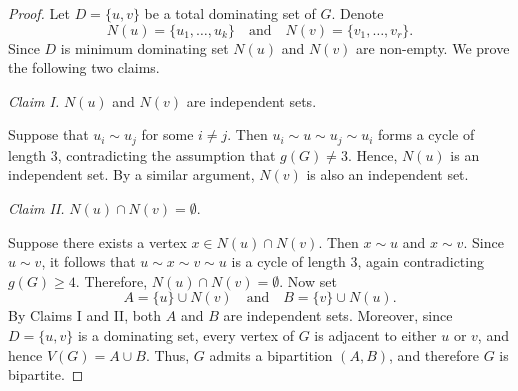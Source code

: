 \documentclass[10pt,a4paper]{amsart}
\begin{document}
\begin{proof}
Let $D=\{u,v\}$ be a total dominating set of $G$. 
Denote
\[
N(u)=\{u_1,\dots,u_k\}
\quad \text{and} \quad
N(v)=\{v_1,\dots,v_r\}.
\]
Since $D$ is minimum dominating set $N(u)$ and $N(v)$ are non-empty.
We prove the following two claims.

\medskip
\noindent
\textit{Claim I.} $N(u)$ and $N(v)$ are independent sets.

Suppose that $u_i\sim u_j$ for some $i\neq j$. Then
$u_i \sim u \sim u_j \sim u_i$ forms a cycle of length $3$, contradicting the assumption that $g(G)\neq 3$. Hence, $N(u)$ is an independent set. By a similar argument, $N(v)$ is also an independent set.

\medskip
\noindent
\textit{Claim II.} $N(u)\cap N(v)=\emptyset$.

Suppose there exists a vertex $x\in N(u)\cap N(v)$. Then $x\sim u$ and $x\sim v$. Since $u\sim v$, it follows that
$u \sim x \sim v \sim u$
is a cycle of length $3$, again contradicting $g(G)\ge 4$. Therefore, $N(u)\cap N(v)=\emptyset$. Now set
\[
A=\{u\}\cup N(v)
\quad \text{and} \quad
B=\{v\}\cup N(u).
\]
By Claims I and II, both $A$ and $B$ are independent sets. Moreover, since $D=\{u,v\}$ is a dominating set, every vertex of $G$ is adjacent to either $u$ or $v$, and hence $V(G)=A\cup B.$ Thus, $G$ admits a bipartition $(A,B)$, and therefore $G$ is bipartite.
\end{proof}
\end{document}
